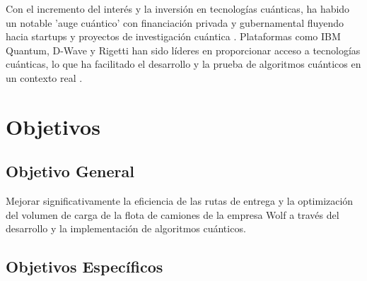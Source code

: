 \documentclass[11pt,a4paper,spanish]{book}
\begin{document}
    Con el incremento del interés y la inversión en tecnologías cuánticas, ha habido un notable 'auge cuántico' con financiación privada y gubernamental fluyendo hacia startups y proyectos de investigación cuántica \citep{quantumTech}. Plataformas como IBM Quantum, D-Wave y Rigetti han sido líderes en proporcionar acceso a tecnologías cuánticas, lo que ha facilitado el desarrollo y la prueba de algoritmos cuánticos en un contexto real \citep{qiskit, dwaveOcean}.


    \chapter{Objetivos}


    \section{Objetivo General}
    Mejorar significativamente la eficiencia de las rutas de entrega y la optimización del volumen de carga de la flota de camiones de la empresa Wolf a través del desarrollo y la implementación de algoritmos cuánticos.

    \section{Objetivos Específicos}
\end{document}
